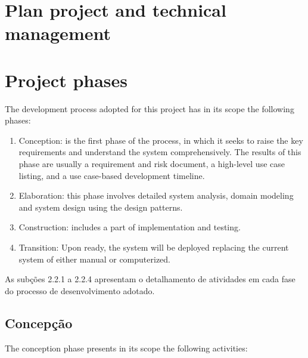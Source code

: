 \documentclass[11pt, twoside, a4paper]{book}
\begin{document}
        	\section{Plan project and technical management}
        	
        		\section{Project phases}
        		
					The development process adopted for this project has in its scope the following phases:
        			
        			\begin{enumerate}
        				
						\item Conception: is the first phase of the process, in which it seeks to raise the key requirements and understand the system comprehensively. The results of this phase are usually a requirement and risk document, a high-level use case listing, and a use case-based development timeline.
						\item Elaboration: this phase involves detailed system analysis, domain modeling and system design using the design patterns.
						\item Construction: includes a part of implementation and testing.
        				\item Transition: Upon ready, the system will be deployed replacing the current system of either manual or computerized.
        				
        			\end{enumerate}
        			
        			As subções 2.2.1 a 2.2.4 apresentam o detalhamento de atividades em cada fase do processo de desenvolvimento adotado.
	        		\subsection{Concepção}

						The conception phase presents in its scope the following activities:	
							
\end{document}
